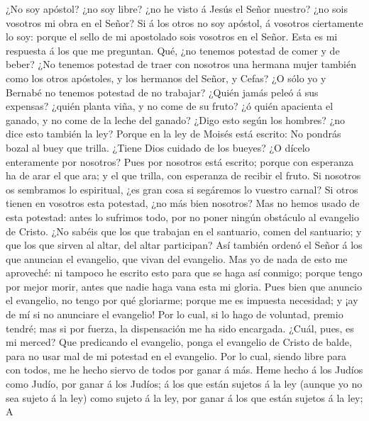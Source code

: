  ¿No soy apóstol? ¿no soy libre? ¿no he visto á Jesús el
Señor nuestro? ¿no sois vosotros mi obra en el Señor?  Si
á los otros no soy apóstol, á vosotros ciertamente lo soy: porque el
sello de mi apostolado sois vosotros en el Señor.  Esta es
mi respuesta á los que me preguntan.  Qué, ¿no tenemos
potestad de comer y de beber?  ¿No tenemos potestad de
traer con nosotros una hermana mujer también como los otros apóstoles, y
los hermanos del Señor, y Cefas?  ¿O sólo yo y Bernabé no
tenemos potestad de no trabajar?  ¿Quién jamás peleó á sus
expensas? ¿quién planta viña, y no come de su fruto? ¿ó quién apacienta
el ganado, y no come de la leche del ganado?  ¿Digo esto
según los hombres? ¿no dice esto también la ley?  Porque
en la ley de Moisés está escrito: No pondrás bozal al buey que trilla.
¿Tiene Dios cuidado de los bueyes?  ¿O dícelo enteramente
por nosotros? Pues por nosotros está escrito; porque con esperanza ha de
arar el que ara; y el que trilla, con esperanza de recibir el fruto.
 Si nosotros os sembramos lo espiritual, ¿es gran cosa si
segáremos lo vuestro carnal?  Si otros tienen en vosotros
esta potestad, ¿no más bien nosotros? Mas no hemos usado de esta
potestad: antes lo sufrimos todo, por no poner ningún obstáculo al
evangelio de Cristo.  ¿No sabéis que los que trabajan en
el santuario, comen del santuario; y que los que sirven al altar, del
altar participan?  Así también ordenó el Señor á los que
anuncian el evangelio, que vivan del evangelio.  Mas yo
de nada de esto me aproveché: ni tampoco he escrito esto para que se
haga así conmigo; porque tengo por mejor morir, antes que nadie haga
vana esta mi gloria.  Pues bien que anuncio el evangelio,
no tengo por qué gloriarme; porque me es impuesta necesidad; y ¡ay de mí
si no anunciare el evangelio!  Por lo cual, si lo hago de
voluntad, premio tendré; mas si por fuerza, la dispensación me ha sido
encargada.  ¿Cuál, pues, es mi merced? Que predicando el
evangelio, ponga el evangelio de Cristo de balde, para no usar mal de mi
potestad en el evangelio.  Por lo cual, siendo libre para
con todos, me he hecho siervo de todos por ganar á más. 
Heme hecho á los Judíos como Judío, por ganar á los Judíos; á los que
están sujetos á la ley (aunque yo no sea sujeto á la ley) como sujeto á
la ley, por ganar á los que están sujetos á la ley;  A
